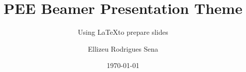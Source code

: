 \newcommand{\testcolor}[1]{\colorbox{#1}{\textcolor{#1}{test}}~\texttt{#1}}
\newcommand{\hrefcol}[2]{\textcolor{cyan}{\href{#1}{#2}}}


\title{PEE Beamer Presentation Theme}
\subtitle{Using \LaTeX to prepare slides}
\author{Ellizeu Rodrigues Sena}
\date{\today}
